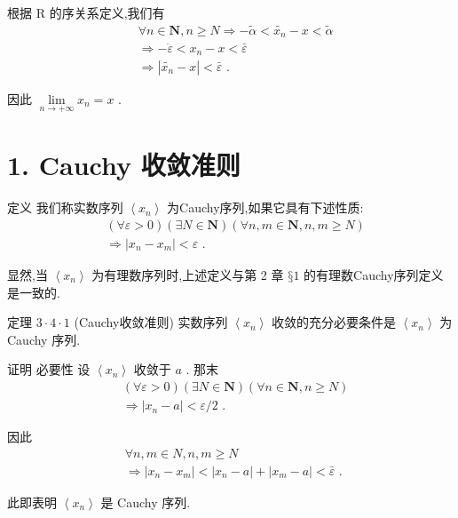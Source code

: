 根据 $\mathrm{R}$ 的序关系定义,我们有
\begin{align*}
	&\forall n \in  \mathbf{N},n \geq  N \Rightarrow   - \widetilde{\alpha } < \widetilde{{x}_{n}} - x < \widetilde{\alpha }\\
	&\Rightarrow   - \ddot{\varepsilon } < {x}_{n} - x < \bar{\varepsilon }\\
	&\Rightarrow  \left| {\widetilde{{x}_{n}} - x}\right|  < \bar{\varepsilon }\text{ . }
\end{align*}

因此 $\mathop{\lim }\limits_{{n \rightarrow   + \infty }}{x}_{n} = x$ .

\section*{1. Cauchy 收敛准则}

定义 我们称实数序列 $\left\langle  {x}_{n}\right\rangle$ 为Cauchy序列,如果它具有下述性质:
\begin{align*}
	&\left( {\forall \varepsilon  > 0}\right) \left( {\exists N \in  \mathbf{N}}\right) \left( {\forall n,m \in  \mathbf{N},n,m \geq  N}\right)\\
	&\Rightarrow  \left| {{x}_{n} - {x}_{m}}\right|  < \varepsilon \text{ . }
\end{align*}

显然,当 $\left\langle  {x}_{n}\right\rangle$ 为有理数序列时,上述定义与第 2 章 $§1$ 的有理数Cauchy序列定义是一致的.

定理 $3 \cdot  4 \cdot  1$ (Cauchy收敛准则) 实数序列 $\left\langle  {x}_{n}\right\rangle$ 收敛的充分必要条件是 $\left\langle  {x}_{n}\right\rangle$ 为 Cauchy 序列.

证明 必要性 设 $\left\langle  {x}_{n}\right\rangle$ 收敛于 $a$ . 那末
\begin{align*}
	&\left( {\forall \varepsilon  > 0}\right) \left( {\exists N \in  \mathbf{N}}\right) \left( {\forall n \in  \mathbf{N},n \geq  N}\right)\\
	&\Rightarrow  \left| {{x}_{n} - a}\right|  < \varepsilon /2\text{ . }
\end{align*}

因此
\begin{align*}
	&\forall n,m \in  N,n,m \geq  N\\
	&\Rightarrow  \left| {{x}_{n} - {x}_{m}}\right|  < \left| {{x}_{n} - a}\right|  + \left| {{x}_{m} - a}\right|  < \bar{\varepsilon }\text{ . }
\end{align*}

此即表明 $\left\langle  {x}_{n}\right\rangle$ 是 Cauchy 序列.

